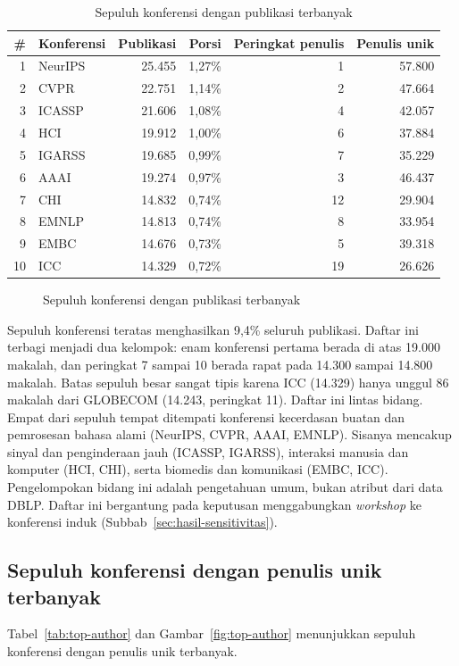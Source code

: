 \begin{table}[ht]
\caption{Sepuluh konferensi dengan publikasi terbanyak}
\label{tab:top-pub}
\small
\begin{tabular}{@{}rlrrrr@{}}
\toprule
\textbf{\#} & \textbf{Konferensi} & \textbf{Publikasi} & \textbf{Porsi} & \textbf{Peringkat penulis} & \textbf{Penulis unik} \\
\midrule
1 & NeurIPS & 25.455 & 1,27\% & 1 & 57.800 \\
2 & CVPR & 22.751 & 1,14\% & 2 & 47.664 \\
3 & ICASSP & 21.606 & 1,08\% & 4 & 42.057 \\
4 & HCI & 19.912 & 1,00\% & 6 & 37.884 \\
5 & IGARSS & 19.685 & 0,99\% & 7 & 35.229 \\
6 & AAAI & 19.274 & 0,97\% & 3 & 46.437 \\
7 & CHI & 14.832 & 0,74\% & 12 & 29.904 \\
8 & EMNLP & 14.813 & 0,74\% & 8 & 33.954 \\
9 & EMBC & 14.676 & 0,73\% & 5 & 39.318 \\
10 & ICC & 14.329 & 0,72\% & 19 & 26.626 \\
\bottomrule
\end{tabular}
\end{table}

\begin{figure}[ht]
\centering
{}
\caption{Sepuluh konferensi dengan publikasi terbanyak}
\label{fig:top-pub}
\end{figure}

Sepuluh konferensi teratas menghasilkan 9,4\% seluruh publikasi. Daftar ini terbagi menjadi dua kelompok: enam konferensi pertama berada di atas 19.000 makalah, dan peringkat 7 sampai 10 berada rapat pada 14.300 sampai 14.800 makalah. Batas sepuluh besar sangat tipis karena ICC (14.329) hanya unggul 86 makalah dari GLOBECOM (14.243, peringkat 11). Daftar ini lintas bidang. Empat dari sepuluh tempat ditempati konferensi kecerdasan buatan dan pemrosesan bahasa alami (NeurIPS, CVPR, AAAI, EMNLP). Sisanya mencakup sinyal dan penginderaan jauh (ICASSP, IGARSS), interaksi manusia dan komputer (HCI, CHI), serta biomedis dan komunikasi (EMBC, ICC). Pengelompokan bidang ini adalah pengetahuan umum, bukan atribut dari data DBLP. Daftar ini bergantung pada keputusan menggabungkan \textit{workshop} ke konferensi induk (Subbab~\ref{sec:hasil-sensitivitas}).

\subsection{Sepuluh konferensi dengan penulis unik terbanyak}
\label{sec:hasil-top-author}
Tabel~\ref{tab:top-author} dan Gambar~\ref{fig:top-author} menunjukkan sepuluh konferensi dengan penulis unik terbanyak.

